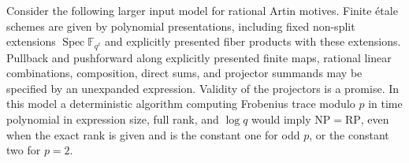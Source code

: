 \begin{proposition}
\label{prop:constant-artin-rank}
Consider the following larger input model for rational Artin
motives.  Finite \'etale schemes are given by polynomial
presentations, including fixed non-split extensions
$\operatorname{Spec}\mathbb F_{q^\ell}$ and explicitly presented
fiber products with these extensions.  Pullback and pushforward along explicitly
presented finite maps, rational linear combinations,
composition, direct sums, and projector summands may be
specified by an unexpanded expression.  Validity of the
projectors is a promise.  In this model a deterministic algorithm computing
Frobenius trace modulo $p$ in time polynomial in expression
size, full rank, and $\log q$ would imply
$\mathrm{NP}=\mathrm{RP}$, even when the exact rank is given
and is the constant one for odd $p$, or the constant two for
$p=2$.
\end{proposition}
